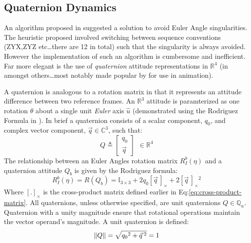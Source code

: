 \subsection{Quaternion Dynamics}
\label{subsec:dynamics.rigidbody.quaternion}
An algorithm proposed in \cite{euleranglesingularity} suggested a solution to avoid Euler Angle singularities. The heuristic proposed involved switching between sequence conventions (ZYX,ZYZ etc\ldots there are 12 in total) such that the singularity is always avoided. However the implementation of such an algorithm is cumbersome and inefficient. Far more elegant is the use of \emph{quaternion} attitude representations in $\mathbb{R}^4$ (in \cite{rotationsequences,quaterniondynamics,spacecraftattitutdequaternions} amongst others\ldots most notably made popular by \cite{shoemake} for use in animation).
\par
A quaternion is analogous to a rotation matrix in that it represents an attitude difference between two reference frames. An $\mathbb{R}^3$ attitude is paramterized as one rotation $\theta$ about a single unit \emph{Euler} axis $\hat{u}$ (demonstrated using the Rodriguez Formula in \cite{unwinding}). In brief a quaternion consists of a scalar component, $q_0$, and complex vector component, $\vec{q}\in \mathbb{C}^3$, such that:
\begin{equation}
Q\triangleq 
\begin{bmatrix}
q_0 \\
\vec{q}
\end{bmatrix}
~~\in\mathbb{R}^4
\end{equation}
The relationship between an Euler Angles rotation matrix $R_I^b(\eta)$ and a quaternion attitude $Q_b$ is given by the Rodriguez formula:
\begin{equation}\label{eq:rodriguez}
R_I^b(\eta)=R(Q_b)=\mathbb{I}_{3\times 3}+2q_0[\vec{q}\hspace{2pt}]_\times+2[\vec{q}\hspace{2pt}]_\times\text{}^2
\end{equation}
Where $[.]_\times$ is the cross-product matrix defined earlier in Eq:\ref{eq:cross-product-matrix}. All quaternions, unless otherwise specified, are unit quaternions $Q\in\mathbb{Q}_u$. Quaternion with a unity magnitude ensure that rotational operations maintain the vector operand's magnitude. A unit quaternion is defined:
\begin{equation}
\left\lVert Q\right\rVert=\sqrt{{q_0}^2+\vec{q}\text{}\hspace{2pt}^2}=1
\end{equation}
